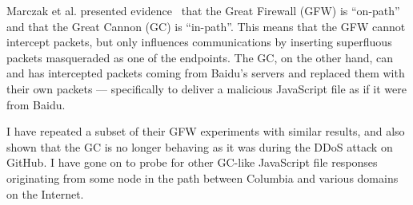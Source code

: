 Marczak et al. presented evidence~\cite{Marczak2015} that the Great Firewall (GFW) is “on-path” and that the Great Cannon (GC) is “in-path”.
This means that the GFW cannot intercept packets, but only influences communications by inserting superfluous packets masqueraded as one of the endpoints.
The GC, on the other hand, can and has intercepted packets coming from Baidu's servers and replaced them with their own packets --– specifically to deliver a malicious JavaScript file as if it were from Baidu.

I have repeated a subset of their GFW experiments with similar results, and also shown that the GC is no longer behaving as it was during the DDoS attack on GitHub.
I have gone on to probe for other GC-like JavaScript file responses originating from some node in the path between Columbia and various domains on the Internet.